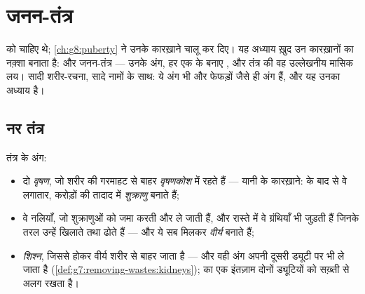 \chapter{जनन-तंत्र}\label{ch:g8:reproductive-systems}

 को  चाहिए थे;
\cref{ch:g8:puberty} ने उनके कारख़ाने चालू कर दिए। यह अध्याय ख़ुद उन
कारख़ानों का नक़्शा बनाता है:  और  जनन-तंत्र --- उनके अंग, हर एक
के बनाए , और  तंत्र की वह उल्लेखनीय मासिक लय। सादी शरीर-रचना,
सादे नामों के साथ: ये अंग भी  और फेफड़ों जैसे ही अंग हैं, और यह उनका
अध्याय है।

\section{नर तंत्र}

\begin{definition}[नर जनन-तंत्र]\label{def:g8:reproductive-systems:male}
 तंत्र के अंग:
\begin{itemize}
  \item दो \emph{वृषण}, जो शरीर की गरमाहट से बाहर
        \emph{वृषणकोश} में रहते हैं --- यानी  के कारख़ाने:
         के बाद से वे लगातार, करोड़ों की तादाद में
        \emph{शुक्राणु} बनाते हैं;
  \item वे नलियाँ, जो शुक्राणुओं को जमा करती और ले जाती हैं, और रास्ते
        में वे ग्रंथियाँ भी जुड़ती हैं जिनके तरल उन्हें खिलाते तथा ढोते
        हैं --- और ये सब मिलकर \emph{वीर्य} बनाते हैं;
  \item \emph{शिश्न}, जिससे होकर वीर्य शरीर से बाहर जाता
        है --- और वही अंग अपनी दूसरी ड्यूटी पर  भी ले जाता है
        (\cref{def:g7:removing-wastes:kidneys});  का एक इंतज़ाम
        दोनों ड्यूटियों को सख़्ती से अलग रखता है।
\end{itemize}
\end{definition}

